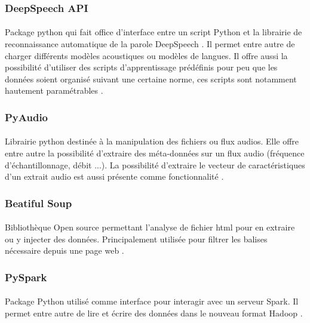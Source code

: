 		\subsubsection*{DeepSpeech API}
		\paragraph{}
		Package python qui fait office d'interface entre un script Python et la librairie de reconnaissance automatique de la parole DeepSpeech \cite{deepspeech_paper}. Il permet entre autre de charger différents modèles acoustiques ou modèles de langues. Il offre aussi la possibilité d'utiliser des scripts d'apprentissage prédéfinis pour peu que les données soient organisé suivant une certaine norme, ces scripts sont notamment hautement paramétrables \cite{deepseech_github}.
		
		\subsubsection*{PyAudio}
		\paragraph{}
		Librairie python destinée à la manipulation des fichiers ou flux audios. Elle offre entre autre la possibilité d'extraire des méta-données sur un flux audio (fréquence d'échantillonnage, débit ...). La possibilité d'extraire le vecteur de caractéristiques d'un extrait audio est aussi présente comme fonctionnalité \cite{pyaudio}.
		
		\subsubsection*{Beatiful Soup}
		\paragraph{}
		Bibliothèque Open source permettant l'analyse de fichier html pour en extraire ou y injecter des données. Principalement utilisée pour filtrer les balises nécessaire depuis une page web \cite{bs4}.
		
		\subsubsection*{PySpark}
		\paragraph{}
		Package Python utilisé comme interface pour interagir avec un serveur Spark. Il permet entre autre de lire et écrire des données dans le nouveau format Hadoop \cite{pyspark}.
		

